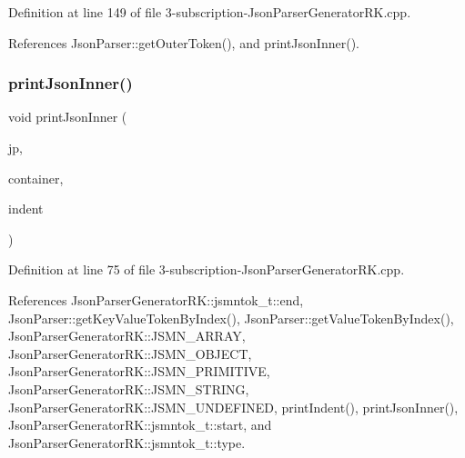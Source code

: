 Definition at line 149 of file 3-\/subscription-\/\+Json\+Parser\+Generator\+R\+K.\+cpp.



References Json\+Parser\+::get\+Outer\+Token(), and print\+Json\+Inner().

\mbox{\label{3-subscription-_json_parser_generator_r_k_8cpp_a7a86f133587ae90abe048be568db828f}} 
\subsubsection{\texorpdfstring{print\+Json\+Inner()}{printJsonInner()}}
{\footnotesize\ttfamily void print\+Json\+Inner (\begin{DoxyParamCaption}\item[{\hyperlink{class_json_parser}{Json\+Parser} \&}]{jp,  }\item[{const \hyperlink{struct_json_parser_generator_r_k_1_1jsmntok__t}{Json\+Parser\+Generator\+R\+K\+::jsmntok\+\_\+t} $\ast$}]{container,  }\item[{size\+\_\+t}]{indent }\end{DoxyParamCaption})}



Definition at line 75 of file 3-\/subscription-\/\+Json\+Parser\+Generator\+R\+K.\+cpp.



References Json\+Parser\+Generator\+R\+K\+::jsmntok\+\_\+t\+::end, Json\+Parser\+::get\+Key\+Value\+Token\+By\+Index(), Json\+Parser\+::get\+Value\+Token\+By\+Index(), Json\+Parser\+Generator\+R\+K\+::\+J\+S\+M\+N\+\_\+\+A\+R\+R\+AY, Json\+Parser\+Generator\+R\+K\+::\+J\+S\+M\+N\+\_\+\+O\+B\+J\+E\+CT, Json\+Parser\+Generator\+R\+K\+::\+J\+S\+M\+N\+\_\+\+P\+R\+I\+M\+I\+T\+I\+VE, Json\+Parser\+Generator\+R\+K\+::\+J\+S\+M\+N\+\_\+\+S\+T\+R\+I\+NG, Json\+Parser\+Generator\+R\+K\+::\+J\+S\+M\+N\+\_\+\+U\+N\+D\+E\+F\+I\+N\+ED, print\+Indent(), print\+Json\+Inner(), Json\+Parser\+Generator\+R\+K\+::jsmntok\+\_\+t\+::start, and Json\+Parser\+Generator\+R\+K\+::jsmntok\+\_\+t\+::type.

\mbox{\label{3-subscription-_json_parser_generator_r_k_8cpp_abe6d5621640c26d89a09be56928cd923}} 
